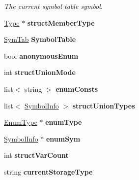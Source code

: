 \begin{DoxyCompactItemize}
\begin{DoxyCompactList}\small\item\em The current symbol table symbol. \end{DoxyCompactList}\item 
\hypertarget{classCCompiler_a02fc8ef09323133c13a029917bdd948e}{\hyperlink{classType}{Type} $\ast$ {\bfseries struct\-Member\-Type}}\label{classCCompiler_a02fc8ef09323133c13a029917bdd948e}

\item 
\hypertarget{classCCompiler_a3315c6b835f8f910f175630d365592f0}{\hyperlink{classSymTab}{Sym\-Tab} {\bfseries Symbol\-Table}}\label{classCCompiler_a3315c6b835f8f910f175630d365592f0}

\item 
\hypertarget{classCCompiler_a89ebb609ccc09244cb053653e140f3af}{bool {\bfseries anonymous\-Enum}}\label{classCCompiler_a89ebb609ccc09244cb053653e140f3af}

\item 
\hypertarget{classCCompiler_aac65ea272c3c5420391022d16e01bc35}{int {\bfseries struct\-Union\-Mode}}\label{classCCompiler_aac65ea272c3c5420391022d16e01bc35}

\item 
\hypertarget{classCCompiler_a287a662cd51fe0664007b567d59471fe}{list$<$ string $>$ {\bfseries enum\-Consts}}\label{classCCompiler_a287a662cd51fe0664007b567d59471fe}

\item 
\hypertarget{classCCompiler_a89b905b1d1cfdb45834d614eaef34bb0}{list$<$ \hyperlink{structSymbolInfo}{Symbol\-Info} $>$ {\bfseries struct\-Union\-Types}}\label{classCCompiler_a89b905b1d1cfdb45834d614eaef34bb0}

\item 
\hypertarget{classCCompiler_a4ff138adce2161dc4e4245848ee5a046}{\hyperlink{classEnumType}{Enum\-Type} $\ast$ {\bfseries enum\-Type}}\label{classCCompiler_a4ff138adce2161dc4e4245848ee5a046}

\item 
\hypertarget{classCCompiler_ace828fe28709f8cfcb28e6bcdc5a6e98}{\hyperlink{structSymbolInfo}{Symbol\-Info} $\ast$ {\bfseries enum\-Sym}}\label{classCCompiler_ace828fe28709f8cfcb28e6bcdc5a6e98}

\item 
\hypertarget{classCCompiler_a786c697900f9a3e71f017c87274b3162}{int {\bfseries struct\-Var\-Count}}\label{classCCompiler_a786c697900f9a3e71f017c87274b3162}

\item 
\hypertarget{classCCompiler_a38f57d1aee607d53a6ab48eb85946342}{string {\bfseries current\-Storage\-Type}}\label{classCCompiler_a38f57d1aee607d53a6ab48eb85946342}


\end{DoxyCompactItemize}
